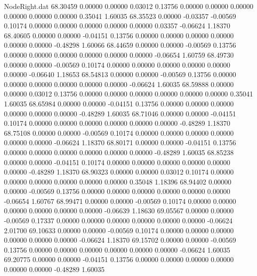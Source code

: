\begin{filecontents}{NodeRight.dat}
  68.30459    0.00000    0.00000     0.03012    0.13756    0.00000    0.00000    0.00000    0.00000    0.00000    0.00000    0.35041    1.60035
  68.35523    0.00000   -0.03357    -0.00569    0.10174    0.00000    0.00000    0.00000    0.00000    0.00000    0.03357   -0.06624    1.18370
  68.40605    0.00000    0.00000    -0.04151    0.13756    0.00000    0.00000    0.00000    0.00000    0.00000    0.00000   -0.48298    1.60066
  68.44659    0.00000    0.00000    -0.00569    0.13756    0.00000    0.00000    0.00000    0.00000    0.00000    0.00000   -0.06654    1.60759
  68.49730    0.00000    0.00000    -0.00569    0.10174    0.00000    0.00000    0.00000    0.00000    0.00000    0.00000   -0.06640    1.18653
  68.54813    0.00000    0.00000    -0.00569    0.13756    0.00000    0.00000    0.00000    0.00000    0.00000    0.00000   -0.06624    1.60035
  68.59888    0.00000    0.00000     0.03012    0.13756    0.00000    0.00000    0.00000    0.00000    0.00000    0.00000    0.35041    1.60035
  68.65984    0.00000    0.00000    -0.04151    0.13756    0.00000    0.00000    0.00000    0.00000    0.00000    0.00000   -0.48289    1.60035
  68.71046    0.00000    0.00000    -0.04151    0.10174    0.00000    0.00000    0.00000    0.00000    0.00000    0.00000   -0.48289    1.18370
  68.75108    0.00000    0.00000    -0.00569    0.10174    0.00000    0.00000    0.00000    0.00000    0.00000    0.00000   -0.06624    1.18370
  68.80171    0.00000    0.00000    -0.04151    0.13756    0.00000    0.00000    0.00000    0.00000    0.00000    0.00000   -0.48289    1.60035
  68.85238    0.00000    0.00000    -0.04151    0.10174    0.00000    0.00000    0.00000    0.00000    0.00000    0.00000   -0.48289    1.18370
  68.90323    0.00000    0.00000     0.03012    0.10174    0.00000    0.00000    0.00000    0.00000    0.00000    0.00000    0.35048    1.18396
  68.94402    0.00000    0.00000    -0.00569    0.13756    0.00000    0.00000    0.00000    0.00000    0.00000    0.00000   -0.06654    1.60767
  68.99471    0.00000    0.00000    -0.00569    0.10174    0.00000    0.00000    0.00000    0.00000    0.00000    0.00000   -0.06639    1.18630
  69.05567    0.00000    0.00000    -0.00569    0.17337    0.00000    0.00000    0.00000    0.00000    0.00000    0.00000   -0.06624    2.01700
  69.10633    0.00000    0.00000    -0.00569    0.10174    0.00000    0.00000    0.00000    0.00000    0.00000    0.00000   -0.06624    1.18370
  69.15702    0.00000    0.00000    -0.00569    0.13756    0.00000    0.00000    0.00000    0.00000    0.00000    0.00000   -0.06624    1.60035
  69.20775    0.00000    0.00000    -0.04151    0.13756    0.00000    0.00000    0.00000    0.00000    0.00000    0.00000   -0.48289    1.60035

\end{filecontents}
